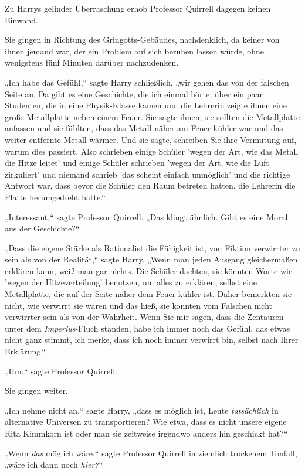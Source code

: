 {Zu Harrys gelinder Überraschung erhob Professor Quirrell dagegen keinen Einwand.

Sie gingen in Richtung des Gringotts-Gebäudes, nachdenklich, da keiner von ihnen jemand war, der ein Problem auf sich beruhen lassen würde, ohne wenigstens fünf Minuten darüber nachzudenken.

„Ich habe das Gefühl,“ sagte Harry schließlich, „wir gehen das von der falschen Seite an. Da gibt es eine Geschichte, die ich einmal hörte, über ein paar Studenten, die in eine Physik-Klasse kamen und die Lehrerin zeigte ihnen eine große Metallplatte neben einem Feuer. Sie sagte ihnen, sie sollten die Metallplatte anfassen und sie fühlten, dass das Metall näher am Feuer kühler war und das weiter entfernte Metall wärmer. Und sie sagte, schreiben Sie ihre Vermutung auf, warum dies passiert. Also schrieben einige Schüler 'wegen der Art, wie das Metall die Hitze leitet' und einige Schüler schrieben 'wegen der Art, wie die Luft zirkuliert' und niemand schrieb 'das scheint einfach unmöglich' und die richtige Antwort war, dass bevor die Schüler den Raum betreten hatten, die Lehrerin die Platte herumgedreht hatte.“

„Interessant,“ sagte Professor Quirrell. „Das klingt ähnlich. Gibt es eine Moral aus der Geschichte?“

„Dass die eigene Stärke als Rationalist die Fähigkeit ist, von Fiktion verwirrter zu sein als von der Realität,“ sagte Harry. „Wenn man jeden Ausgang gleichermaßen erklären kann, weiß man gar nichts. Die Schüler dachten, sie könnten Worte wie 'wegen der Hitzeverteilung' benutzen, um alles zu erklären, selbst eine Metallplatte, die auf der Seite näher dem Feuer kühler ist. Daher bemerkten sie nicht, wie verwirrt sie waren und das hieß, sie konnten vom Falschen nicht verwirrter sein als von der Wahrheit. Wenn Sie mir sagen, dass die Zentauren unter dem \emph{Imperius}-Fluch standen, habe ich immer noch das Gefühl, das etwas nicht ganz stimmt, ich merke, dass ich noch immer verwirrt bin, selbst nach Ihrer Erklärung.“

„Hm,“ sagte Professor Quirrell.

Sie gingen weiter.

„Ich nehme nicht an,“ sagte Harry, „dass es möglich ist, Leute \emph{tatsächlich} in alternative Universen zu transportieren? Wie etwa, dass es nicht unsere eigene Rita Kimmkorn ist oder man sie zeitweise irgendwo anders hin geschickt hat?“

„Wenn \emph{das} möglich wäre,“ sagte Professor Quirrell in ziemlich trockenem Tonfall, „wäre ich dann noch \emph{hier?}“

}
